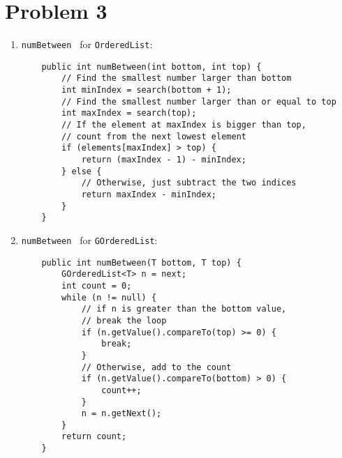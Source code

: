 \documentclass[12pt]{article}
\begin{document}
\section{Problem 3}
\begin{enumerate}[label=(\alph*)]
\item {\tt numBetween } for {\tt OrderedList}:
  \begin{verbatim}
    public int numBetween(int bottom, int top) {
        // Find the smallest number larger than bottom
        int minIndex = search(bottom + 1);
        // Find the smallest number larger than or equal to top
        int maxIndex = search(top);
        // If the element at maxIndex is bigger than top,
        // count from the next lowest element
        if (elements[maxIndex] > top) {
            return (maxIndex - 1) - minIndex;
        } else {
            // Otherwise, just subtract the two indices
            return maxIndex - minIndex;
        }
    }
  \end{verbatim}
\item {\tt numBetween } for {\tt GOrderedList}:
  \begin{verbatim}
    public int numBetween(T bottom, T top) {
        GOrderedList<T> n = next;
        int count = 0;
        while (n != null) {
            // if n is greater than the bottom value,
            // break the loop
            if (n.getValue().compareTo(top) >= 0) {
                break;
            }
            // Otherwise, add to the count
            if (n.getValue().compareTo(bottom) > 0) {
                count++;
            }
            n = n.getNext();
        }
        return count;
    }
  \end{verbatim}
\end{enumerate}
\end{document}
